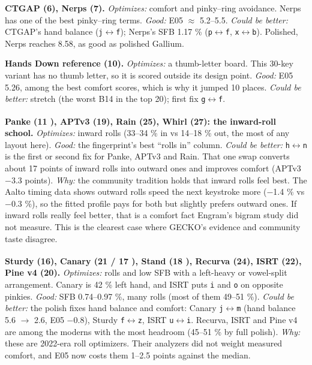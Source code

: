 \documentclass{gecko-paper}
\begin{document}
{\textbf{CTGAP (6), Nerps (7).} \emph{Optimizes:} comfort and pinky–ring avoidance. Nerps has one of the best pinky–ring terms. \emph{Good:} E05 $\approx$ 5.2–5.5. \emph{Could be better:} CTGAP's hand balance (\texttt{j$\leftrightarrow$f}); Nerps's SFB 1.17 \% (\texttt{p$\leftrightarrow$f}, \texttt{x$\leftrightarrow$b}). Polished, Nerps reaches 8.58, as good as polished Gallium.

\textbf{Hands Down reference (10).} \emph{Optimizes:} a thumb-letter board. This 30-key variant has no thumb letter, so it is scored outside its design point. \emph{Good:} E05 5.26, among the best comfort scores, which is why it jumped 10 places. \emph{Could be better:} stretch (the worst B14 in the top 20); first fix \texttt{g$\leftrightarrow$f}.

\textbf{Panke (11 \textsuperscript{\dag}), APTv3 (19), Rain (25), Whirl (27): the inward-roll school.} \emph{Optimizes:} inward rolls (33–34 \% in vs 14–18 \% out, the most of any layout here). \emph{Good:} the fingerprint's best “rolls in” column. \emph{Could be better:} \texttt{h$\leftrightarrow$n} is the first or second fix for Panke, APTv3 and Rain. That one swap converts about 17 points of inward rolls into outward ones and
improves comfort (APTv3 $-$3.3 points). \emph{Why:} the community tradition holds that inward rolls feel best. The Aalto timing data shows outward rolls speed the next keystroke more ($-$1.4 \% vs $-$0.3 \%), so the fitted profile pays for both but slightly prefers outward ones. If inward rolls really feel better, that is a comfort fact Engram's bigram study did not measure. This is the clearest case
where GECKO's evidence and community taste disagree.

\textbf{Sturdy (16), Canary (21 / 17 \textsuperscript{\dag}), Stand (18 \textsuperscript{\dag}), Recurva (24), ISRT (22), Pine v4 (20).} \emph{Optimizes:} rolls and low SFB with a left-heavy or vowel-split arrangement. Canary is 42 \% left hand, and ISRT puts \texttt{i} and \texttt{o} on opposite pinkies. \emph{Good:} SFB 0.74–0.97 \%, many rolls (most of them 49–51 \%). \emph{Could be better:} the polish fixes hand balance and comfort:
Canary \texttt{j$\leftrightarrow$m} (hand balance 5.6 $\to$ 2.6, E05 $-$0.8), Sturdy \texttt{f$\leftrightarrow$z}, ISRT \texttt{u$\leftrightarrow$i}. Recurva, ISRT and Pine v4 are among the moderns with the most headroom (45–51 \% by full polish). \emph{Why:} these are 2022-era roll optimizers. Their analyzers did not weight measured comfort, and E05 now costs them 1–2.5 points against the median.

}
\end{document}
